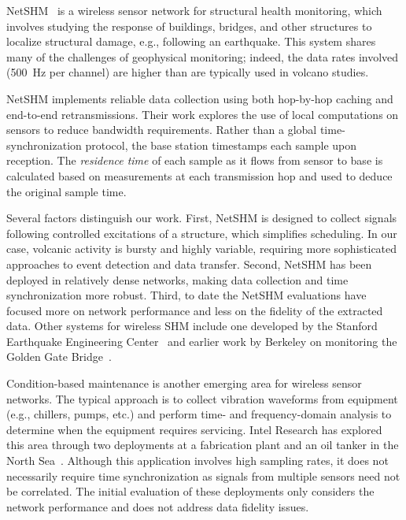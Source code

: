 NetSHM~\cite{netshm-ewsnsubmission,netshm-emnets05,wisan} is a 
wireless sensor network for structural health monitoring, which
involves studying the response of buildings, bridges, and other
structures to localize structural damage, e.g., following an
earthquake. This system shares many of the challenges of 
geophysical monitoring; indeed, the data rates involved (500~Hz 
per channel) are higher than are typically used in volcano
studies. 

NetSHM implements reliable data collection using both hop-by-hop caching
and end-to-end retransmissions. Their work explores the use of
local computations on sensors to reduce bandwidth requirements.
Rather than a global time-synchronization protocol, the base station 
timestamps each sample upon reception. The {\em residence time} of 
each sample as it flows from sensor to base is calculated based on
measurements at each transmission hop and used to deduce the 
original sample time.

Several factors distinguish our work. First, NetSHM is designed to collect
signals following controlled excitations of a structure, which simplifies
scheduling.  In our case, volcanic activity is bursty and highly variable,
requiring more sophisticated approaches to event detection and data transfer.
Second, NetSHM has been deployed in relatively dense networks, making data
collection and time synchronization more robust.  Third, to date the NetSHM
evaluations have focused more on network performance and less on the fidelity
of the extracted data.  Other systems for wireless SHM include one developed
by the Stanford Earthquake Engineering
Center~\cite{wimms-lynch06,wimms-wang05} and earlier work by Berkeley on
monitoring the Golden Gate Bridge~\cite{ggb-monitoring}.

Condition-based maintenance is another emerging area for
wireless sensor networks. The typical approach is to collect
vibration waveforms from equipment (e.g., chillers, pumps, etc.) 
and perform time- and frequency-domain analysis to determine when
the equipment requires servicing. Intel Research has explored this
area through two deployments at a fabrication plant and an oil tanker 
in the North Sea~\cite{intel-northseasensys}. Although this application
involves high sampling rates, it does not necessarily require time
synchronization as signals from multiple sensors need not be correlated.
The initial evaluation of these deployments only considers the
network performance and does not address data fidelity issues.

